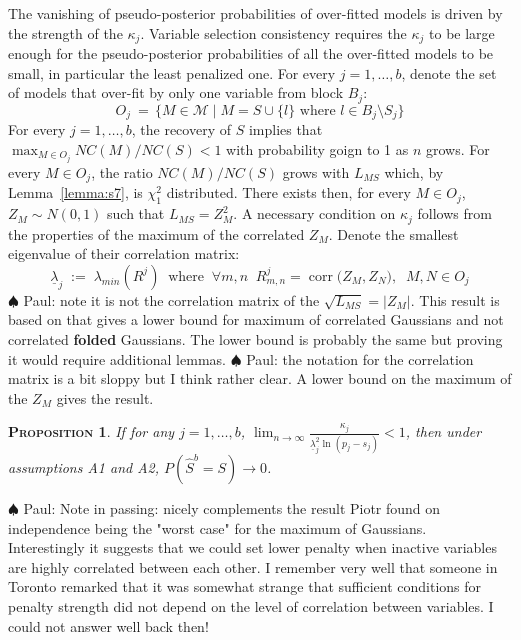 \documentclass[aos]{imsart}
\theoremstyle{plain}
\newtheorem{prop}{\textsc{Proposition}}[section]
\newcommand{\paul}[1]{{\small{\color{green} \sf $\spadesuit$ Paul: #1}}}
\begin{document}
The vanishing of pseudo-posterior probabilities of over-fitted models is driven by the strength of the $\kappa_j$. Variable selection consistency requires the $\kappa_j$ to be large enough for the pseudo-posterior probabilities of all the over-fitted models to be small, in particular the least penalized one. For every $j=1,\ldots,b$, denote the set of models that over-fit by only one variable from block $B_j$:
$$O_j \:=\,\{M\in \mathcal{M}\;|\; M=S\cup\{l\} \text{ where } l\in B_j\setminus S_j\}$$
For every $j=1,\ldots,b$, the recovery of $S$ implies that $\max_{M\in O_j}NC(M)/NC(S)<1$ with probability goign to 1 as $n$ grows. For every $M\in O_j$, the ratio $NC(M)/NC(S)$ grows with $L_{MS}$ which, by Lemma~\ref{lemma:s7}, is $\chi^2_1$ distributed. There exists then, for every $M\in O_j$, $Z_M \sim N(0,1)$ such that $L_{MS}=Z_M^2$. A necessary condition on $\kappa_j$ follows from the properties of the maximum of the correlated $Z_M$. Denote the smallest eigenvalue of their correlation matrix:
\begin{equation}
    \underline{\lambda}_j\;:=\;\lambda_{min}(R^j)\;\;\text{where} \;\;\forall m,n\;\;R^j_{m,n}=\operatorname{corr}\big(Z_M,Z_N\big),\;\;M,N \in O_j
\end{equation}
\paul{note it is not the correlation matrix of the $\sqrt{L_{MS}}=|Z_M|$. This result is based on \cite{hartigan} that gives a lower bound for maximum of correlated Gaussians and not correlated \textbf{folded} Gaussians. The lower bound is probably the same but proving it would require additional lemmas.}
\paul{the notation for the correlation matrix is a bit sloppy but I think rather clear.}
A lower bound on the maximum of the $Z_M$ gives the result.
\begin{prop}\label{prop:nectypeIreg}
     If for any $j=1,\ldots,b$,  $\lim_{n\to\infty}\frac{\kappa_j}{\underline{\lambda}_j^2\ln(p_j-s_j)} <1$, then under assumptions A1 and A2, $P(\hat{S}^b=S) \to 0$.
\end{prop}

\paul{Note in passing: \cite{hartigan} nicely complements the result Piotr found on independence being the "worst case" for the maximum of Gaussians.\\
Interestingly it suggests that we could set lower penalty when inactive variables are highly correlated between each other. I remember very well that someone in Toronto remarked that it was somewhat strange that sufficient conditions for penalty strength did not depend on the level of correlation between variables. I could not answer well back then!}
\end{document}

